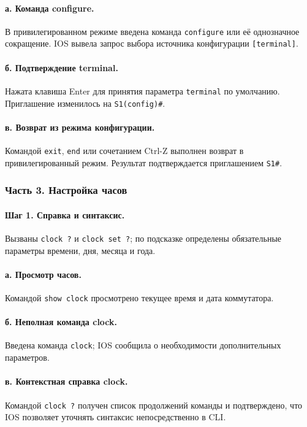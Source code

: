 \documentclass[a4paper,14pt,oneside]{extarticle}
\begin{document}
\paragraph{а. Команда configure.}
В привилегированном режиме введена команда \texttt{configure} или её
однозначное сокращение. IOS вывела запрос выбора источника конфигурации
\texttt{[terminal]}.

\paragraph{б. Подтверждение terminal.}
Нажата клавиша Enter для принятия параметра \texttt{terminal} по умолчанию.
Приглашение изменилось на \texttt{S1(config)\#}.

\paragraph{в. Возврат из режима конфигурации.}
Командой \texttt{exit}, \texttt{end} или сочетанием Ctrl-Z выполнен возврат
в привилегированный режим. Результат подтверждается приглашением
\texttt{S1\#}.

\subsubsection{Часть 3. Настройка часов}

\paragraph{Шаг 1. Справка и синтаксис.}
Вызваны \texttt{clock ?} и \texttt{clock set ?}; по подсказке определены
обязательные параметры времени, дня, месяца и года.

\paragraph{а. Просмотр часов.}
Командой \texttt{show clock} просмотрено текущее время и дата
коммутатора.

\paragraph{б. Неполная команда clock.}
Введена команда \texttt{clock}; IOS сообщила о необходимости дополнительных
параметров.

\paragraph{в. Контекстная справка clock.}
Командой \texttt{clock ?} получен список продолжений команды и подтверждено,
что IOS позволяет уточнять синтаксис непосредственно в CLI.
\end{document}
